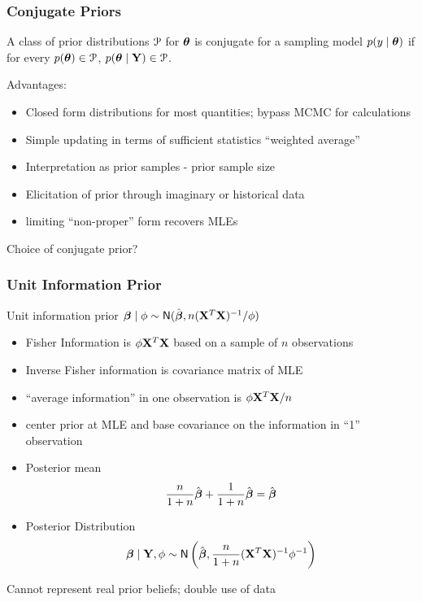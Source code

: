 \documentclass[handout]{beamer}
\begin{document}
\begin{frame}
  \frametitle{Conjugate Priors}
  \begin{definition}
    A class of prior distributions ${\cal{P}}$ for $\boldsymbol{\theta}$ is conjugate for a
    sampling model $p(y \mid \boldsymbol{\theta})$ if for every $p(\boldsymbol{\theta}) \in {\cal{P}}$, $p(\boldsymbol{\theta}
    \mid \mathbf{Y}) \in {\cal{P}}$.
  \end{definition}
\pause  
  Advantages: \pause
  \begin{itemize}
  \item Closed form distributions for most quantities; bypass MCMC for
    calculations \pause
  \item Simple updating in terms of sufficient statistics ``weighted
    average'' \pause
  \item Interpretation as prior samples - prior sample size \pause
  \item Elicitation of prior through imaginary or historical data \pause
  \item limiting ``non-proper'' form recovers MLEs \pause
  \end{itemize}
Choice of conjugate prior?
\end{frame}

\begin{frame}
  \frametitle{Unit Information Prior}

Unit information prior $\boldsymbol{\beta} \mid \phi \sim \textsf{N}(\hat{\boldsymbol{\beta}}, n
   (\mathbf{X}^T\mathbf{X})^{-1}/\phi)$ \pause
  \begin{itemize}
\item Fisher Information is $\phi \mathbf{X}^T\mathbf{X}$ based on a sample of $n$
  observations \pause
\item Inverse Fisher information is covariance matrix of MLE \pause
\item ``average information'' in one observation is  $\phi \mathbf{X}^T\mathbf{X} /n$ \pause
\item center prior at MLE and base covariance on the information in
  ``1'' observation \pause
\item  Posterior mean 
$$\frac{n}{1 + n} \hat{\boldsymbol{\beta}} +  \frac{1}{1 + n}\hat{\boldsymbol{\beta}} = \hat{\boldsymbol{\beta}}$$ \pause
\item Posterior Distribution 
$$\boldsymbol{\beta} \mid \mathbf{Y}, \phi \sim \textsf{N}\left( \hat{\boldsymbol{\beta}}, \frac{n}{1 + n} (\mathbf{X}^T\mathbf{X})^{-1}
  \phi^{-1} \right)$$ \pause
    \end{itemize}
Cannot represent real prior beliefs; double use of data
\end{frame}
\end{document}

